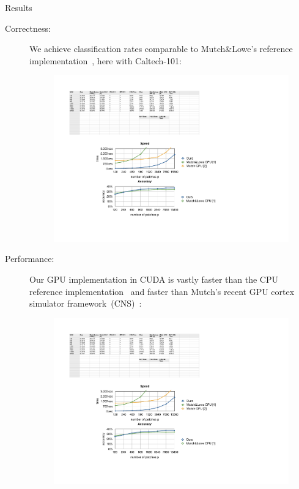 \documentclass[final]{beamer}
\begin{document}
\begin{frame}{}
\begin{columns}[t]
\begin{column}{.48\linewidth}
        \begin{block}{Results}
				\begin{description}
				\item[ 	Correctness: ]
We achieve classification rates comparable to Mutch\&Lowe's reference implementation~\cite{mutch06}, here with Caltech-101:
				\begin{figure}[htb]
				  \centering
			    \includegraphics[scale=2.25]{images/accuracy} 
				\end{figure}
		\item[ 	Performance: ]
	Our GPU implementation in CUDA is vastly faster than the CPU reference implementation~\cite{mutch06} and faster than Mutch's recent GPU cortex simulator framework~(CNS)~\cite{mutch10}:
		\begin{figure}[htb]
		  \centering
	    \includegraphics[scale=2.25]{images/speed} 

\end{figure}
\end{description}
\end{block}
\end{column}
\end{columns}
\end{frame}
\end{document}
